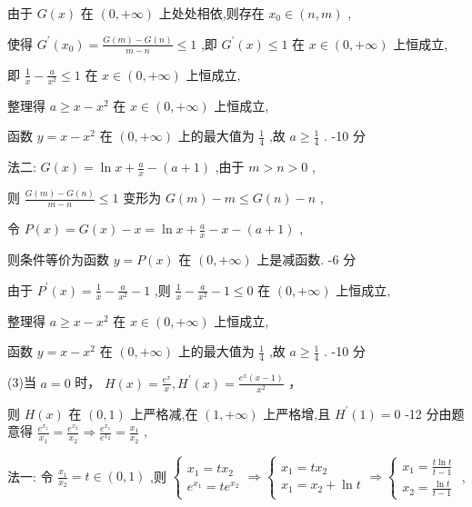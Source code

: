 \documentclass[10pt]{article}
\begin{document}
由于 \(G\left( x\right)\) 在 \(\left( {0, + \infty }\right)\) 上处处相依,则存在 \({x}_{0} \in  \left( {n,m}\right)\) ,

使得 \({G}^{\prime }\left( {x}_{0}\right)  = \frac{G\left( m\right)  - G\left( n\right) }{m - n} \leq  1\) ,即 \({G}^{\prime }\left( x\right)  \leq  1\) 在 \(x \in  \left( {0, + \infty }\right)\) 上恒成立,

即 \(\frac{1}{x} - \frac{a}{{x}^{2}} \leq  1\) 在 \(x \in  \left( {0, + \infty }\right)\) 上恒成立,

整理得 \(a \geq  x - {x}^{2}\) 在 \(x \in  \left( {0, + \infty }\right)\) 上恒成立,

函数 \(y = x - {x}^{2}\) 在 \(\left( {0, + \infty }\right)\) 上的最大值为 \(\frac{1}{4}\) ,故 \(a \geq  \frac{1}{4}\) . -10 分

法二: \(G\left( x\right)  = \ln x + \frac{a}{x} - \left( {a + 1}\right)\) ,由于 \(m > n > 0\) ,

则 \(\frac{G\left( m\right)  - G\left( n\right) }{m - n} \leq  1\) 变形为 \(G\left( m\right)  - m \leq  G\left( n\right)  - n\) ,

令 \(P\left( x\right)  = G\left( x\right)  - x = \ln x + \frac{a}{x} - x - \left( {a + 1}\right)\) ,

则条件等价为函数 \(y = P\left( x\right)\) 在 \(\left( {0, + \infty }\right)\) 上是减函数. -6 分

由于 \({P}^{\prime }\left( x\right)  = \frac{1}{x} - \frac{a}{{x}^{2}} - 1\) ,则 \(\frac{1}{x} - \frac{a}{{x}^{2}} - 1 \leq  0\) 在 \(\left( {0, + \infty }\right)\) 上恒成立,

整理得 \(a \geq  x - {x}^{2}\) 在 \(x \in  \left( {0, + \infty }\right)\) 上恒成立,

函数 \(y = x - {x}^{2}\) 在 \(\left( {0, + \infty }\right)\) 上的最大值为 \(\frac{1}{4}\) ,故 \(a \geq  \frac{1}{4}\) . -10 分

(3)当 \(a = 0\) 时， \(H\left( x\right)  = \frac{{e}^{x}}{x},{H}^{\prime }\left( x\right)  = \frac{{e}^{x}\left( {x - 1}\right) }{{x}^{2}}\) ，

则 \(H\left( x\right)\) 在 \(\left( {0,1}\right)\) 上严格减,在 \(\left( {1, + \infty }\right)\) 上严格增,且 \({H}^{\prime }\left( 1\right)  = 0\) -12 分由题意得 \(\frac{{e}^{{x}_{1}}}{{x}_{1}} = \frac{{e}^{{x}_{2}}}{{x}_{2}} \Rightarrow  \frac{{e}^{{x}_{1}}}{{e}^{{x}_{2}}} = \frac{{x}_{1}}{{x}_{2}}\) ,

法一: 令 \(\frac{{x}_{1}}{{x}_{2}} = t \in  \left( {0,1}\right)\) ,则 \(\left\{  {\begin{array}{l} {x}_{1} = t{x}_{2} \\  {e}^{{x}_{1}} = t{e}^{{x}_{2}} \end{array} \Rightarrow  \left\{  {\begin{array}{l} {x}_{1} = t{x}_{2} \\  {x}_{1} = {x}_{2} + \ln t \end{array} \Rightarrow  \left\{  \begin{array}{l} {x}_{1} = \frac{t\ln t}{t - 1} \\  {x}_{2} = \frac{\ln t}{t - 1} \end{array}\right. }\right. }\right.\) ,
\end{document}

